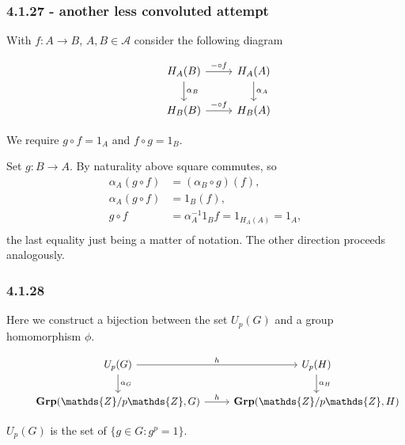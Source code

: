 \documentclass{article}
\begin{document}
\subsubsection*{4.1.27 - another less convoluted attempt}

With $f\colon A \rightarrow B$, $A, B \in \mathcal{A}$ consider the following diagram

\begin{equation*}
\begin{tikzcd}
  & H_A(B) \arrow[d,"\alpha_B"] \arrow[r, "\mathit{-} \circ f"] & H_A(A) \arrow[d,"\alpha_{A}"] \\
  & H_{B}(B) \arrow[r,"\mathit{-} \circ f"] & H_{B}(A)
\end{tikzcd}
\end{equation*}

We require $g \circ f = 1_A$ and $f \circ g = 1_B$.

Set $g\colon B \rightarrow A$. By naturality above square commutes, so
\begin{align*}
  \alpha_A(g \circ f) &= (\alpha_B \circ g)(f),   \\
  \alpha_A(g \circ f) &= 1_B(f), \\
  g \circ f &= \alpha_A^{-1}1_Bf = 1_{H_A(A)} = 1_A, \\
\end{align*}
the last equality just being a matter of notation. The other direction proceeds analogously.

\subsubsection*{4.1.28}

Here we construct a bijection between the set $U_p(G)$ and a group homomorphism $\phi$.

\begin{equation*}
\begin{tikzcd}
  & U_p(G) \arrow[d,"\alpha_G"] \arrow[r, "h"] & U_p(H) \arrow[d,"\alpha_{H}"] \\
  & \mathbf{Grp}(\mathds{Z}/p\mathds{Z}, G) \arrow[r,"h"] & \mathbf{Grp}(\mathds{Z}/p\mathds{Z}, H)
\end{tikzcd}
\end{equation*}

$U_p(G)$ is the set of $\{g \in G\colon g^p = 1\}$.
\end{document}
